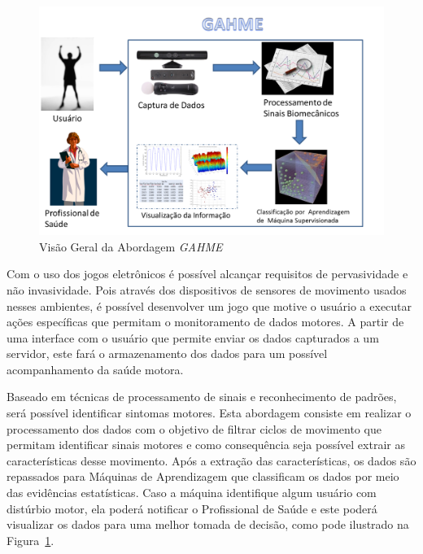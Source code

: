 \begin{figure}[!htb]
     \centering
     \includegraphics[width=1\textwidth]{./img/systemoverview.png}
     \caption{Visão Geral da Abordagem \textit{GAHME}}
     \label{img:visaogeral}
\end{figure}

Com o uso dos jogos eletrônicos é possível alcançar requisitos de pervasividade e não invasividade. Pois através dos dispositivos de sensores de movimento usados nesses ambientes, é possível desenvolver um jogo que motive o usuário a executar ações específicas que permitam o monitoramento de dados motores. A partir de uma interface com o usuário que permite enviar os dados capturados a um servidor, este fará o armazenamento dos dados para um possível acompanhamento da saúde motora.

Baseado em técnicas de processamento de sinais e reconhecimento de padrões, será possível identificar sintomas motores. Esta abordagem consiste em realizar o processamento dos dados com o objetivo de filtrar ciclos de movimento que permitam identificar sinais motores e como consequência seja possível extrair as características desse movimento. Após a extração das características, os dados são repassados para Máquinas de Aprendizagem que classificam os dados por meio das evidências estatísticas. Caso a máquina identifique algum usuário com distúrbio motor, ela poderá notificar o Profissional de Saúde e este poderá visualizar os dados para uma melhor tomada de decisão, como pode ilustrado na Figura~\ref{img:visaogeral}.


